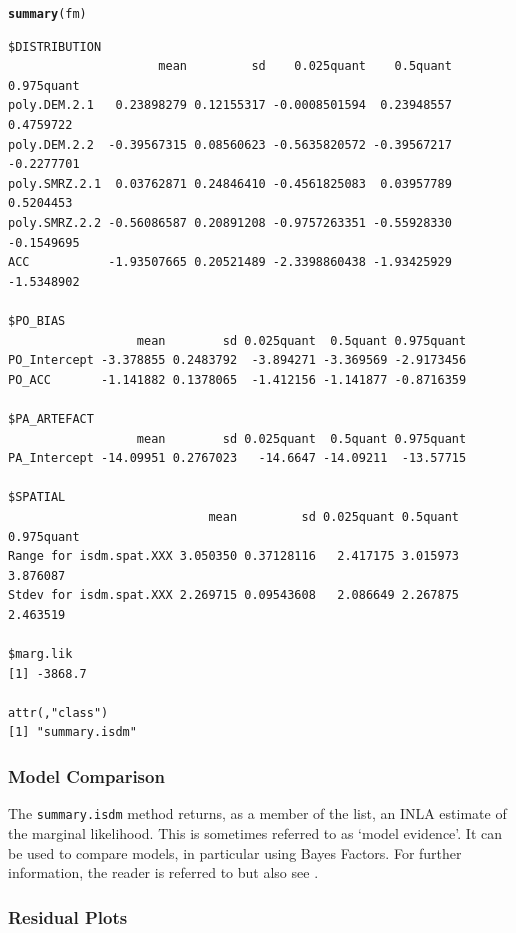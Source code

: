 \documentclass[article,shortnames,nojss]{jss}\usepackage[]{graphicx}\usepackage[]{xcolor}
\makeatletter
\newcommand{\hlstd}[1]{\textcolor[rgb]{0.345,0.345,0.345}{#1}}%
\newcommand{\hlkwd}[1]{\textcolor[rgb]{0.737,0.353,0.396}{\textbf{#1}}}%
\newenvironment{kframe}{%
 \def\at@end@of@kframe{}%
 \ifinner\ifhmode%
  \def\at@end@of@kframe{\end{minipage}}%
  \begin{minipage}{\columnwidth}%
 \fi\fi%
 \def\FrameCommand##1{\hskip\@totalleftmargin \hskip-\fboxsep
 \colorbox{shadecolor}{##1}\hskip-\fboxsep
     \hskip-\linewidth \hskip-\@totalleftmargin \hskip\columnwidth}%
 \MakeFramed {\advance\hsize-\width
   \@totalleftmargin\z@ \linewidth\hsize
   \@setminipage}}%
 {\par\unskip\endMakeFramed%
 \at@end@of@kframe}
\newenvironment{knitrout}{}{} %
\makeatother
\begin{document}
\begin{knitrout}
\color{fgcolor}\begin{kframe}
\begin{alltt}
\hlkwd{summary}\hlstd{( fm)}
\end{alltt}
\begin{verbatim}
$DISTRIBUTION
                     mean         sd    0.025quant    0.5quant 0.975quant
poly.DEM.2.1   0.23898279 0.12155317 -0.0008501594  0.23948557  0.4759722
poly.DEM.2.2  -0.39567315 0.08560623 -0.5635820572 -0.39567217 -0.2277701
poly.SMRZ.2.1  0.03762871 0.24846410 -0.4561825083  0.03957789  0.5204453
poly.SMRZ.2.2 -0.56086587 0.20891208 -0.9757263351 -0.55928330 -0.1549695
ACC           -1.93507665 0.20521489 -2.3398860438 -1.93425929 -1.5348902

$PO_BIAS
                  mean        sd 0.025quant  0.5quant 0.975quant
PO_Intercept -3.378855 0.2483792  -3.894271 -3.369569 -2.9173456
PO_ACC       -1.141882 0.1378065  -1.412156 -1.141877 -0.8716359

$PA_ARTEFACT
                  mean        sd 0.025quant  0.5quant 0.975quant
PA_Intercept -14.09951 0.2767023   -14.6647 -14.09211  -13.57715

$SPATIAL
                            mean         sd 0.025quant 0.5quant 0.975quant
Range for isdm.spat.XXX 3.050350 0.37128116   2.417175 3.015973   3.876087
Stdev for isdm.spat.XXX 2.269715 0.09543608   2.086649 2.267875   2.463519

$marg.lik
[1] -3868.7

attr(,"class")
[1] "summary.isdm"
\end{verbatim}
\end{kframe}
\end{knitrout}
    
\subsubsection*{Model Comparison}

The \texttt{summary.isdm} method returns, as a member of the list, an INLA estimate of the marginal likelihood. This is sometimes referred to as `model evidence'. It can be used to compare models, in particular using Bayes Factors. For further information, the reader is referred to \citet{kas95} but also see \citet{gel13}.
    
\subsubsection*{Residual Plots} \label{subsubsec:res}
  
\end{document}
